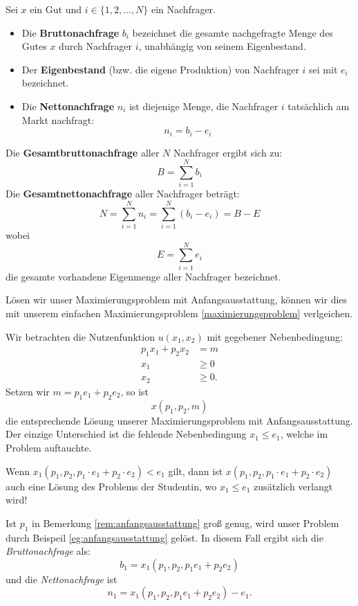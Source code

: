 \begin{definition}
	Sei $x$ ein Gut und $i \in \{1, 2, \dots, N\}$ ein Nachfrager.
	\begin{itemize}
		\item Die \textbf{Bruttonachfrage} $b_i$ bezeichnet die gesamte nachgefragte Menge des Gutes $x$ durch Nachfrager $i$, unabhängig von seinem Eigenbestand.
		\item Der \textbf{Eigenbestand} (bzw. die eigene Produktion) von Nachfrager $i$ sei mit $e_i$ bezeichnet.
		\item Die \textbf{Nettonachfrage} $n_i$ ist diejenige Menge, die Nachfrager $i$ tatsächlich am Markt nachfragt:
		      \[
			      n_i = b_i - e_i
		      \]
	\end{itemize}
	Die \textbf{Gesamtbruttonachfrage} aller $N$ Nachfrager ergibt sich zu:
	\[
		B = \sum_{i=1}^{N} b_i
	\]
	Die \textbf{Gesamtnettonachfrage} aller Nachfrager beträgt:
	\[
		N = \sum_{i=1}^{N} n_i = \sum_{i=1}^{N} (b_i - e_i) = B - E
	\]
	wobei
	\[
		E = \sum_{i=1}^{N} e_i
	\]
	die gesamte vorhandene Eigenmenge aller Nachfrager bezeichnet.
\end{definition}
Lösen wir unser Maximierungsproblem mit Anfangsausstattung, können wir dies mit unserem einfachen Maximierungsproblem \ref{maximierungsproblem} verlgeichen.
\begin{example} \label{eg:anfangsausstattung}
	Wir betrachten die Nutzenfunktion $u(x_1,x_2)$ mit gegebener Nebenbedingung:
	\begin{align*}
		p_1 x_1 + p_2 x_2 & = m    \\
		x_1               & \ge  0 \\
		x_2               & \ge  0
		.\end{align*}
	Setzen wir $m= p_1 e_1 + p_2 e_2$, so ist
	\[
		x(p_1,p_2,m)
	\]
	die entsprechende Lösung unserer Maximierungsproblem mit Anfangsausstattung.
	Der einzige Unterschied ist die fehlende Nebenbedingung $x_1 \le e_1$, welche
	im Problem auftauchte.
\end{example}


\begin{remark} \label{rem:anfangsausstattung}
	Wenn $x_1(p_1, p_2, p_1\cdot  e_1 + p_2\cdot  e_2) < e_1$ gilt,
	dann ist $x(p_1, p_2, p_1\cdot  e_1 + p_2\cdot  e_2)$ auch eine Lösung des Problems der
	Studentin, wo $x_1 \le  e_1$ zusätzlich verlangt wird!
\end{remark}

Ist $p_1$ in Bemerkung \ref{rem:anfangsausstattung} groß genug, wird unser Problem durch Beispeil \ref{eg:anfangsausstattung} gelöst.
In diesem Fall ergibt sich die \emph{Bruttonachfrage} als:
\[
	b_1 = x_1(p_1,p_2,p_1e_1+p_2e_2)
\]
und die \emph{Nettonachfrage} ist
\[
	n_1 = x_1(p_1,p_2,p_1e_1+p_2e_2) - e_1
	.\]
